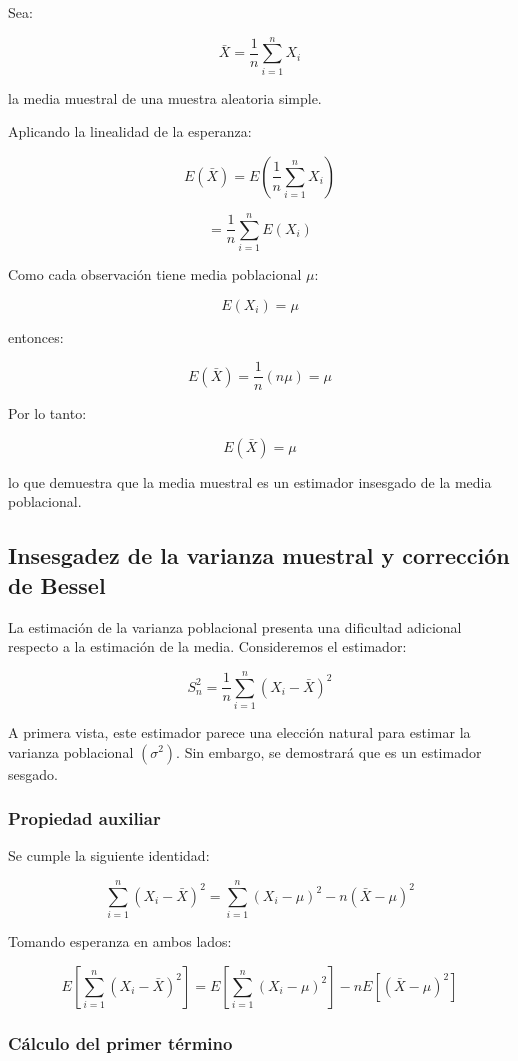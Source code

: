 \documentclass[
  11pt,
]{report}
\begin{document}
Sea:

\[\bar X
=
\frac{1}{n}
\sum_{i=1}^{n}
X_i\]

la media muestral de una muestra aleatoria simple.

Aplicando la linealidad de la esperanza:

\[E(\bar X)
=
E\left(
\frac{1}{n}
\sum_{i=1}^{n}
X_i
\right)\]

\[=
\frac{1}{n}
\sum_{i=1}^{n}
E(X_i)\]

Como cada observación tiene media poblacional \(\mu\):

\[E(X_i)=\mu\]

entonces:

\[E(\bar X)
=
\frac{1}{n}
(n\mu)
=
\mu\]

Por lo tanto:

\[E(\bar X)=\mu\]

lo que demuestra que la media muestral es un estimador insesgado de la
media poblacional.

\subsection{Insesgadez de la varianza muestral y corrección de
Bessel}\label{insesgadez-de-la-varianza-muestral-y-correcciuxf3n-de-bessel}

La estimación de la varianza poblacional presenta una dificultad
adicional respecto a la estimación de la media. Consideremos el
estimador:

\[S_n^2
=
\frac{1}{n}
\sum_{i=1}^{n}
(X_i-\bar X)^2\]

A primera vista, este estimador parece una elección natural para estimar
la varianza poblacional \((\sigma^2)\). Sin embargo, se demostrará que
es un estimador sesgado.

\subsubsection{Propiedad auxiliar}\label{propiedad-auxiliar}

Se cumple la siguiente identidad:

\[\sum_{i=1}^{n}
(X_i-\bar X)^2
=
\sum_{i=1}^{n}
(X_i-\mu)^2
-
n(\bar X-\mu)^2\]

Tomando esperanza en ambos lados:

\[E\left[
\sum_{i=1}^{n}
(X_i-\bar X)^2
\right]
=
E\left[
\sum_{i=1}^{n}
(X_i-\mu)^2
\right]
-
nE[(\bar X-\mu)^2]\]

\subsubsection{Cálculo del primer
término}\label{cuxe1lculo-del-primer-tuxe9rmino}
\end{document}
